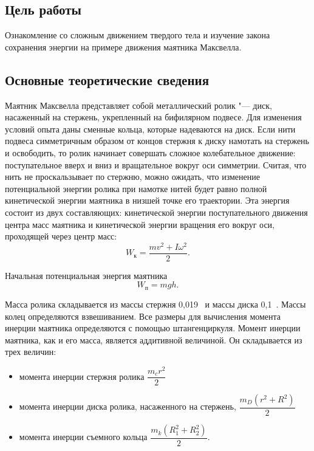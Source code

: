 \documentclass[a4paper, 12pt]{extarticle}
\begin{document}
\MTDTitlePage
\MTDInfoPage

\setcounter{section}{10}

\subsection{Цель работы}
Ознакомление со сложным движением твердого тела и изучение закона сохранения энергии на примере движения маятника Максвелла.

\subsection{Основные теоретические сведения}
Маятник Максвелла представляет собой металлический ролик "--- диск, насаженный на стержень, укрепленный на бифилярном  подвесе. Для изменения условий опыта даны сменные кольца, которые надеваются на диск. Если нити подвеса симметричным образом от концов стержня к диску намотать на стержень и освободить, то ролик начинает совершать сложное колебательное движение: поступательное вверх и вниз и вращательное вокруг оси симметрии. Считая, что нить не проскальзывает по стержню, можно ожидать, что изменение потенциальной энергии ролика при намотке нитей будет равно полной кинетической энергии маятника в низшей точке его траектории. Эта энергия состоит из двух составляющих: кинетической энергии поступательного движения центра масс маятника и кинетической энергии вращения его вокруг оси, проходящей через центр масс: %
\[ %
W_\text{к} = \frac{mv^2 + I\omega^2}{2}. %
\]

Начальная потенциальная энергия маятника %
\[
W_\text{п} = mgh.
\]

Масса ролика складывается из массы стержня 0,019~ и массы диска 0,1~. Массы колец определяются взвешиванием. Все размеры для вычисления момента инерции маятника определяются с помощью штангенциркуля. Момент инерции маятника, как и его масса, является аддитивной величиной. Он складывается из трех величин: %
\begin{itemize}
\item момента инерции стержня ролика $\dfrac{m_c r^2}{2}$
\item момента инерции диска ролика, насаженного на стержень, $\dfrac{m_D (r^2 + R^2)}{2}$
\item момента инерции съемного кольца $\dfrac{m_k(R_1^2 + R_2^2)}{2}$.
\end{itemize}
\end{document}
